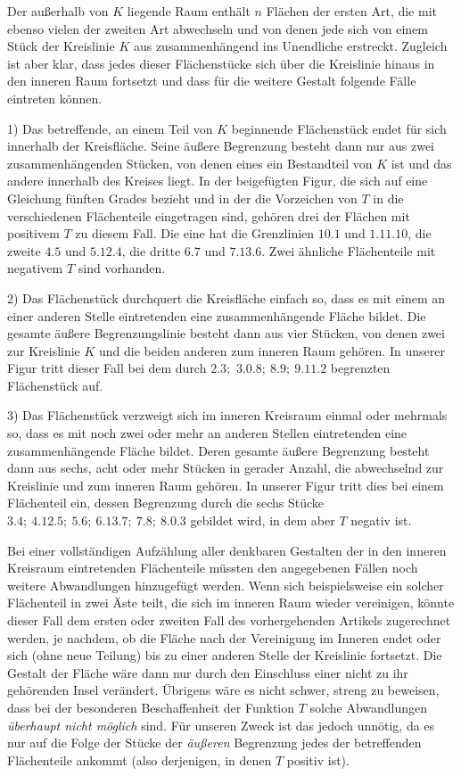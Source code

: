 Der außerhalb von $K$ liegende Raum enthält $n$ Flächen der ersten Art, die mit ebenso vielen der zweiten Art abwechseln und von denen jede sich von einem Stück der Kreislinie $K$ aus zusammenhängend ins Unendliche erstreckt. Zugleich ist aber klar, dass jedes dieser Flächenstücke sich über die Kreislinie hinaus in den inneren Raum fortsetzt und dass für die weitere Gestalt folgende Fälle eintreten können.

1) Das betreffende, an einem Teil von $K$ beginnende Flächenstück endet für sich innerhalb der Kreisfläche. Seine äußere Begrenzung besteht dann nur aus zwei zusammenhängenden Stücken, von denen eines ein Bestandteil von $K$ ist und das andere innerhalb des Kreises liegt. In der beigefügten Figur, die sich auf eine Gleichung fünften Grades bezieht und in der die Vorzeichen von $T$ in die verschiedenen Flächenteile eingetragen sind, gehören drei der Flächen mit positivem $T$ zu diesem Fall. Die eine hat die Grenzlinien $10.1$ und $1.11.10$, die zweite $4.5$ und $5.12.4$, die dritte $6.7$ und $7.13.6$. Zwei ähnliche Flächenteile mit negativem $T$ sind vorhanden.

2) Das Flächenstück durchquert die Kreisfläche einfach so, dass es mit einem an einer anderen Stelle eintretenden eine zusammenhängende Fläche bildet. Die gesamte äußere Begrenzungslinie besteht dann aus vier Stücken, von denen zwei zur Kreislinie $K$ und die beiden anderen zum inneren Raum gehören. In unserer Figur tritt dieser Fall bei dem durch $2.3;$ $3.0.8;\ 8.9;\ 9.11.2$ begrenzten Flächenstück auf.

3) Das Flächenstück verzweigt sich im inneren Kreisraum einmal oder mehrmals so, dass es mit noch zwei oder mehr an anderen Stellen eintretenden eine zusammenhängende Fläche bildet. Deren gesamte äußere Begrenzung besteht dann aus sechs, acht oder mehr Stücken in gerader Anzahl, die abwechselnd zur Kreislinie und zum inneren Raum gehören. In unserer Figur tritt dies bei einem Flächenteil ein, dessen Begrenzung durch die sechs Stücke $3.4;\ 4.12.5;\ 5.6;\ 6.13.7;\ 7.8;\ 8.0.3$ gebildet wird, in dem aber $T$ negativ ist.


Bei einer vollständigen Aufzählung aller denkbaren Gestalten der in den inneren Kreisraum eintretenden Flächenteile müssten den angegebenen Fällen noch weitere Abwandlungen hinzugefügt werden. Wenn sich beispielsweise ein solcher Flächenteil in zwei Äste teilt, die sich im inneren Raum wieder vereinigen, könnte dieser Fall dem ersten oder zweiten Fall des vorhergehenden Artikels zugerechnet werden, je nachdem, ob die Fläche nach der Vereinigung im Inneren endet oder sich (ohne neue Teilung) bis zu einer anderen Stelle der Kreislinie fortsetzt. Die Gestalt der Fläche wäre dann nur durch den Einschluss einer nicht zu ihr gehörenden Insel verändert. Übrigens wäre es nicht schwer, streng zu beweisen, dass bei der besonderen Beschaffenheit der Funktion $T$ solche Abwandlungen \emph{überhaupt nicht möglich} sind. Für unseren Zweck ist das jedoch unnötig, da es nur auf die Folge der Stücke der \emph{äußeren} Begrenzung jedes der betreffenden Flächenteile ankommt (also derjenigen, in denen $T$ positiv ist).

